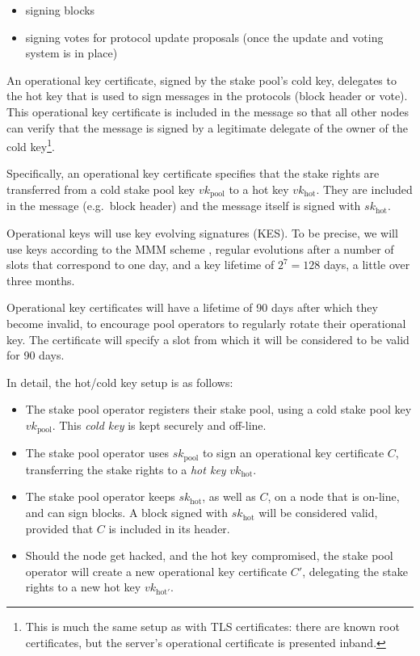 \documentclass[11pt,a4paper,dvipsnames,twosided]{article}
\newcommand{\citep}[1]{\cite{#1}}
\begin{document}
\begin{itemize}
\item
  signing blocks
\item signing votes for protocol update proposals (once the update and
  voting system is in place)
\end{itemize}

An operational key certificate, signed by the stake pool's cold key,
delegates to the hot key that is used to sign messages in the
protocols (block header or vote). This operational key certificate is
included in the message so that all other nodes can verify that the
message is signed by a legitimate delegate of the owner of the cold
key\footnote{This is much the same setup as with TLS certificates:
  there are known root certificates, but the server's operational
  certificate is presented inband.}.

Specifically, an operational key certificate specifies that the
stake rights are transferred from a cold stake pool key \(vk_\text{pool}\)
to a hot key \(vk_\text{hot}\).
They are included in the message (e.g.~block header) and the message
itself is signed with \(sk_\text{hot}\).

Operational keys will use key evolving signatures (KES). To be precise, we will
use keys according to the MMM scheme \citep{cryptoeprint:2001:034}, regular
evolutions after a number of slots that correspond to one day, and a key
lifetime of \(2^7 = 128\) days, a little over three months.

Operational key certificates will have a lifetime of 90 days after which they
become invalid, to encourage pool operators to regularly rotate their
operational key. The certificate will specify a slot from which it will be
considered to be valid for 90 days.

In detail, the hot/cold key setup is as follows:

\begin{itemize}
\item
  The stake pool operator registers their stake pool, using a cold stake pool key
  \(vk_\text{pool}\). This \emph{cold key} is kept securely and
  off-line.
\item The stake pool operator uses \(sk_\text{pool}\)
  to sign an operational key certificate \(C\),
  transferring the stake rights to a \emph{hot key}
  \(vk_\text{hot}\).
\item
  The stake pool operator keeps \(sk_\text{hot}\), as well as \(C\), on
  a node that is on-line, and can sign blocks. A block signed with
  \(sk_\text{hot}\) will be considered valid, provided that \(C\) is
  included in its header.
\item
  Should the node get hacked, and the hot key compromised, the stake
  pool operator will create a new operational key certificate
  \(C'\), delegating the stake rights to a new hot key
  \(vk_{\text{hot}'}\).
\end{itemize}
\end{document}
